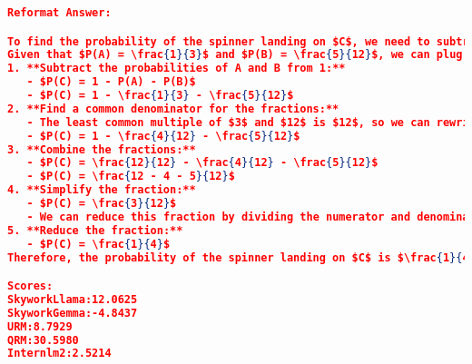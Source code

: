 \begin{lstlisting}[language=json,numbers=none]
Reformat Answer:

To find the probability of the spinner landing on $C$, we need to subtract the probabilities of the spinner landing on $A$ and $B$ from $1$, since the sum of the probabilities of all possible outcomes is $1$. We can write this as an equation: $P(C) = 1 - P(A) - P(B)$.
Given that $P(A) = \frac{1}{3}$ and $P(B) = \frac{5}{12}$, we can plug these values into the equation and simplify.
1. **Subtract the probabilities of A and B from 1:**
   - $P(C) = 1 - P(A) - P(B)$
   - $P(C) = 1 - \frac{1}{3} - \frac{5}{12}$
2. **Find a common denominator for the fractions:**
   - The least common multiple of $3$ and $12$ is $12$, so we can rewrite $\frac{1}{3}$ as $\frac{4}{12}$.
   - $P(C) = 1 - \frac{4}{12} - \frac{5}{12}$
3. **Combine the fractions:**
   - $P(C) = \frac{12}{12} - \frac{4}{12} - \frac{5}{12}$
   - $P(C) = \frac{12 - 4 - 5}{12}$
4. **Simplify the fraction:**
   - $P(C) = \frac{3}{12}$
   - We can reduce this fraction by dividing the numerator and denominator by $3$.
5. **Reduce the fraction:**
   - $P(C) = \frac{1}{4}$
Therefore, the probability of the spinner landing on $C$ is $\frac{1}{4}$.

Scores:
SkyworkLlama:12.0625
SkyworkGemma:-4.8437
URM:8.7929
QRM:30.5980
Internlm2:2.5214
\end{lstlisting}